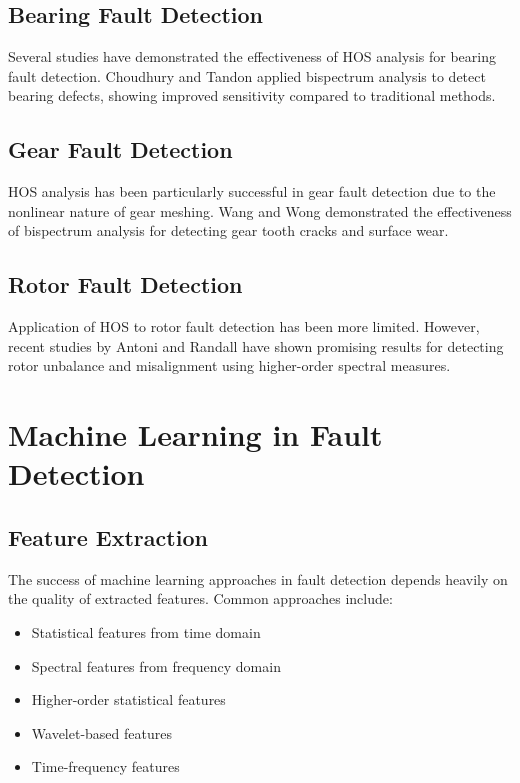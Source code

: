\subsection{Bearing Fault Detection}

Several studies have demonstrated the effectiveness of HOS analysis for bearing fault detection. Choudhury and Tandon \cite{choudhury2000application} applied bispectrum analysis to detect bearing defects, showing improved sensitivity compared to traditional methods.

\subsection{Gear Fault Detection}

HOS analysis has been particularly successful in gear fault detection due to the nonlinear nature of gear meshing. Wang and Wong \cite{wang2001gear} demonstrated the effectiveness of bispectrum analysis for detecting gear tooth cracks and surface wear.

\subsection{Rotor Fault Detection}

Application of HOS to rotor fault detection has been more limited. However, recent studies by Antoni and Randall \cite{antoni2006spectral} have shown promising results for detecting rotor unbalance and misalignment using higher-order spectral measures.

\section{Machine Learning in Fault Detection}

\subsection{Feature Extraction}

The success of machine learning approaches in fault detection depends heavily on the quality of extracted features. Common approaches include:

\begin{itemize}
    \item Statistical features from time domain
    \item Spectral features from frequency domain
    \item Higher-order statistical features
    \item Wavelet-based features
    \item Time-frequency features
\end{itemize}

